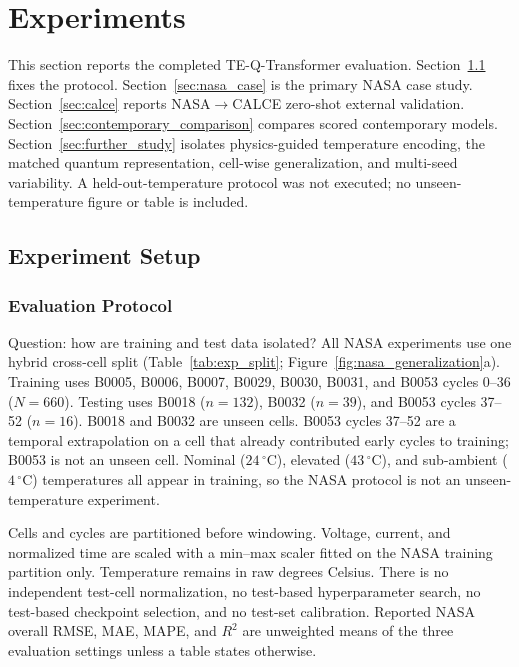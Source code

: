 \section{Experiments}\label{sec:experiments}\label{sec:results}

This section reports the completed TE-Q-Transformer evaluation. Section~\ref{sec:experiment_setup} fixes the protocol. Section~\ref{sec:nasa_case} is the primary NASA case study. Section~\ref{sec:calce} reports NASA$\rightarrow$CALCE zero-shot external validation. Section~\ref{sec:contemporary_comparison} compares scored contemporary models. Section~\ref{sec:further_study} isolates physics-guided temperature encoding, the matched quantum representation, cell-wise generalization, and multi-seed variability. A held-out-temperature protocol was not executed; no unseen-temperature figure or table is included.

\subsection{Experiment Setup}
\label{sec:experiment_setup}

\subsubsection{Evaluation Protocol}
\label{sec:evaluation_protocol}

Question: how are training and test data isolated? All NASA experiments use one hybrid cross-cell split (Table~\ref{tab:exp_split}; Figure~\ref{fig:nasa_generalization}a). Training uses B0005, B0006, B0007, B0029, B0030, B0031, and B0053 cycles 0--36 ($N=660$). Testing uses B0018 ($n=132$), B0032 ($n=39$), and B0053 cycles 37--52 ($n=16$). B0018 and B0032 are unseen cells. B0053 cycles 37--52 are a temporal extrapolation on a cell that already contributed early cycles to training; B0053 is not an unseen cell. Nominal ($24\,^\circ$C), elevated ($43\,^\circ$C), and sub-ambient ($4\,^\circ$C) temperatures all appear in training, so the NASA protocol is not an unseen-temperature experiment.

Cells and cycles are partitioned before windowing. Voltage, current, and normalized time are scaled with a min--max scaler fitted on the NASA training partition only. Temperature remains in raw degrees Celsius. There is no independent test-cell normalization, no test-based hyperparameter search, no test-based checkpoint selection, and no test-set calibration. Reported NASA overall RMSE, MAE, MAPE, and $R^2$ are unweighted means of the three evaluation settings unless a table states otherwise.

